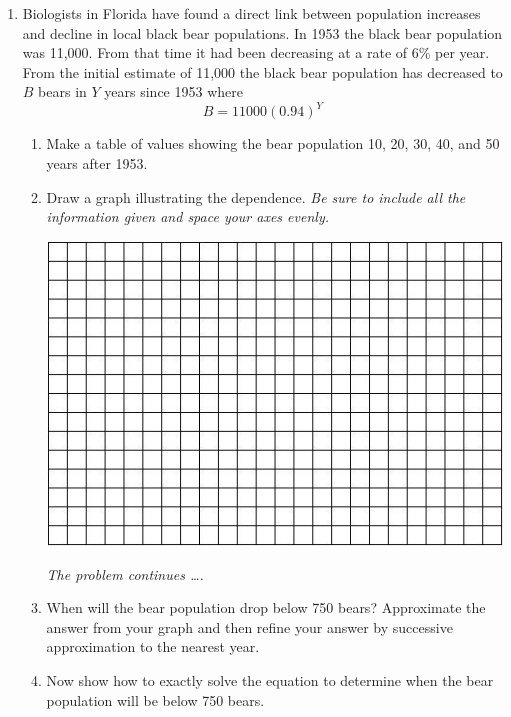\documentclass[12pt]{article}
\begin{document}
\newpage
\begin{enumerate}

\item Biologists in Florida have found a direct link between population increases and decline in local black bear populations.  In 1953 the black bear population was 11,000.  From that time it had been decreasing at a rate of 6\% per year.  From the initial estimate of 11,000 the black bear population has decreased to $B$ bears in $Y$ years since 1953 where $$B=11000(0.94)^Y$$

\begin{enumerate}
\item Make a table of values showing the bear population 10, 20, 30, 40, and 50 years after 1953.  
\vfill
\item Draw a graph illustrating the dependence.  \emph{Be sure to include all the information given and space your axes evenly.}

\vspace{.1in}
\begin{center}
 {\includegraphics [width = 6in] {../GraphPaper}}
\end{center}
\vspace{.1in}

\newpage
\hspace{-.5 in}\emph{The problem continues \ldots.}

\item When will the bear population drop below 750 bears?  Approximate the answer from your graph and then refine your answer by successive approximation to the nearest year.
\vfill
\item Now show how to exactly solve the equation to determine when the bear population will be below 750 bears.
\vfill
\end{enumerate}



\end{enumerate}
\end{document}
